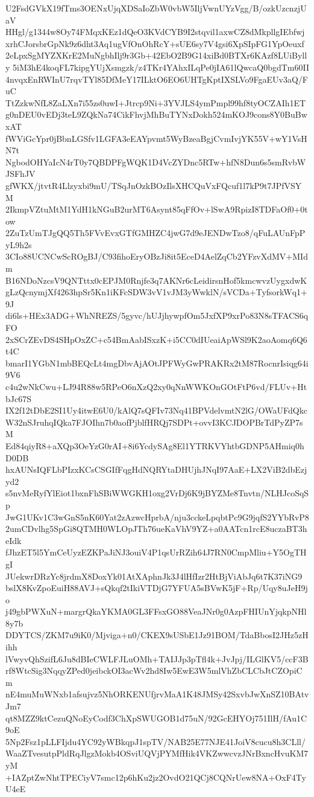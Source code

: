 U2FsdGVkX19fTms3OENxUjqXDSaIoZbW0vbW5IljVwnUYzVgg/B/ozkUzcnzjUaV
HHgl/g1344w8Oy74FMqxKEz1dQeO3KVdCYB9I2stqvil1axwCZ8dMkpllgIEbfwj
xrhCJorsbrGpNk9z6dht3Aq1ugVfOnOhRcY+sUE6sy7V4gsi6XpSIpFG1YpOeuxf
2eLpxSgMYZXKrE2MuNgbhIlj9r3Gb+42EbO2B9G14xiBd0BTXr6KAzf8LUiBylly
5iM3hE4koqFL7kipgYUjXsmgzk/z4TKr4YAhxILqPe0jIA61lQwcaQ0bgdTm60II
4nvqxEnRWInU7rqvTYl85DfMeY17ILktO6EO6UHTgKptIXSLVo9FgaEUv3aQ/FuC
TtZzkwNfL8ZaLXn7i55zs0uwI+Jtrcp9Ni+3YVJLS4ymPmpl99hf8tyOCZAIh1ET
g0nDEU0vEDj3teL9ZQkNa74CikFhvjMhBuTYNxDokh524mKOJ9cons8Y0BuBwxAT
fWViGcYpr0jBbnLGSfv1LGFA3eEAYpvmt5WyBzeaBgjCvmIvjYK55V+wY1VsHN7t
NgbodOHYaIcN4rT0y7QBDPFgWQK1D4VcZYDnc5RTw+hfN8Dun6s5smRvbWJSFhJV
gfWKX/jtvtR4Llzyxbi9mU/TSqJnOzkBOzIlsXHCQuVxFQcuf1l7kP9t7JPfVSYM
2IkmpVZtuMtM1YdH1kNGuB2urMT6Asynt85qFfOv+lSwA9RpizI8TDFaOf0+0tow
2ZuTzUmTJgQQ5Th5FVvEvxGTfGMHZC4jwG7d9eJENDwTzo8/qFuLAUnFpPyL9h2s
3CIo88UCNCwScROgBJ/C93fihoEryOBzJi8it5EceD4AelZqCb2YFzvXdMV+MIdm
B16NDoNzcsV9QNTttx0cEPJM0Rnjfe3q7AKNr6cLeidirsnHof5kmcwvzUygxdwK
gLzQcnymjXf4263hpSr5Kn1iKFcSDW3vV1vJM3yWwklN/sVCDa+TyfsorkWq1+9J
di6ls+HEx3ADG+WhNREZS/5gyvc/hUJjhywpfOm5JxfXP9xrPo83N8sTFACS6qFO
2xSCrZEvDS4SHpOxZC+c54BmAabISxzK+i5CC0dIUeaiApWSl9K2aoAomq6Q6t4C
bmarI1YGbN1mbBEQcLt4mgDbvAjAOtJPFWyGwPRAKRx2tM87RocnrIsiqg64i9V6
c4u2wNkCwu+LJ94R88w5RPeO6nXzQ2xy0qNnWWKOnGOtFtP6vd/FLUv+HtbJc67S
IX2f12tDbE2SI1Uy4itwE6U0/kAlQ7sQFIv73Nq41BPVdelvmtN2lG/OWaUFdQkc
W32nSJruhqIQka7FJOIhn7b0aofPjblfHRQj7SDPt+ovvI3KCJDOPBrTdPyZP7sM
Ed84qiyR8+aXQp3OeYzG0rAI+8i6YcdySAg8El1YTRKVYhtbGDNP5AHmiq0hD0DB
hxAUNsIQFLbPIzxKCsCSGIfFqgHdNQRYtaDHUjhJNqI97AaE+LX2ViB2dbEzjyd2
s5nvMeRyfYlEiot1bxnFhSBiWWGKH1oxg2VrDj6K9jBYZMe8Tnvtn/NLHJcoSqSp
JwG1UKv1C3wGnS5nK60Yat2zAzwcHprbA/nju3cckeLpqbtPc9G9jqfS2YYbRvP8
2umCDvlhg5SpGi8QTMH0WLOpJTh76ueKaVhV9YZ+a0AATcn1rcE8uczaBT3heIdk
fJhzET5l5YmCeUyzEZKPaJiNJ3ouiV4P1qsUrRZih64J7RN0CmpMliu+Y5OgTHgI
JUekwrDRzYc8jrdmX8DoxYk01AtXAphnJk3J4lHfIzr2HtBjViAbJq6t7K37iNG9
bslX8KvZpoEuiH88AVJ+sQkqf2tIkiVTDjG7YFUA5sBVwK5jF+Rp/Uqy8uJeH9jo
j49gbPWXuN+margrQkaYKMA0GL3FFsxGO88VeaJNr0g0AzpFHIUnYjqkpNHl8y7b
DDYTCS/ZKM7u9iK0/Mjviga+n0/CKEX9sUSbE1Jz91BOM/TdaBbosI2JHz5zHihh
lVwyvQhSzifL6Ju8dBIeCWLFJLuOMh+TAIJJp3pTfl4k+JvJpj/ILGlKV5/ccF3B
rf8WtcSig3NqqyZPed0jeibckOI3acWv2hd8Iw5EwE3W5mlVhZbCLCbJtCZOpiCm
nE4muMuWNxb1afsujvz5NhORKENUfjrvMaA1K48JMSy42SxvbJwXnSZ10BAtvJm7
qt8MZZ9ktCezuQNoEyCodf3ChXpSWUGOB1d75uN/92GcEHYOj751IlH/fAu1C9oE
5Np2Fsz1pLLFIjdu4YC92yWBkqpJ1spTV/NAB25E77NJE41JoiV8cucu8h3CLll/
WaaZTvesutpPldRqJlgzMokb4OSviUQVjPYMfHik4VKZwwcvzJNrBxncHvuKM7yM
+IAZptZwNhtTPECiyV7smc12p6hKu2jz2OvdO21QCj8CQNrUew8NA+OxF4TyU4eE
